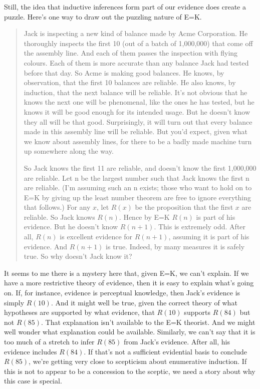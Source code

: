 Still, the idea that inductive inferences form part of our evidence does create a puzzle. Here's one way to draw out the puzzling nature of E=K.

\begin{quote}
Jack is inspecting a new kind of balance made by Acme Corporation. He thoroughly inspects the first 10 (out of a batch of 1,000,000) that come off the assembly line. And each of them passes the inspection with flying colours. Each of them is more accurate than any balance Jack had tested before that day. So Acme is making good balances. He knows, by observation, that the first 10 balances are reliable. He also knows, by induction, that the next balance will be reliable. It's not obvious that he knows the next one will be phenomenal, like the ones he has tested, but he knows it will be good enough for its intended usage. But he doesn't know they all will be that good. Surprisingly, it will turn out that every balance made in this assembly line will be reliable. But you'd expect, given what we know about assembly lines, for there to be a badly made machine turn up somewhere along the way.

So Jack knows the first 11 are reliable, and doesn't know the first 1,000,000 are reliable. Let n be the largest number such that Jack knows the first n are reliable. (I'm assuming such an n exists; those who want to hold on to E=K by giving up the least number theorem are free to ignore everything that follows.) For any \(x\), let \(R(x)\) be the proposition that the first \(x\) are reliable. So Jack knows \(R(n)\). Hence by E=K \(R(n)\) is part of his evidence. But he doesn't know \(R(n+1)\). This is extremely odd. After all, \(R(n)\) is excellent evidence for \(R(n+1)\), assuming it is part of his evidence. And \(R(n+1)\) is true. Indeed, by many measures it is safely true. So why doesn't Jack know it?
\end{quote}

It seems to me there is a mystery here that, given E=K, we can't explain. If we have a more restrictive theory of evidence, then it is easy to explain what's going on. If, for instance, evidence is perceptual knowledge, then Jack's evidence is simply \(R(10)\). And it might well be true, given the correct theory of what hypotheses are supported by what evidence, that \(R(10)\) supports \(R(84)\) but not \(R(85)\). That explanation isn't available to the E=K theorist. And we might well wonder what explanation could be available. Similarly, we can't say that it is too much of a stretch to infer \(R(85)\) from Jack's evidence. After all, his evidence includes \(R(84)\). If that's not a sufficient evidential basis to conclude \(R(85)\), we're getting very close to scepticism about enumerative induction. If this is not to appear to be a concession to the sceptic, we need a story about why this case is special.


